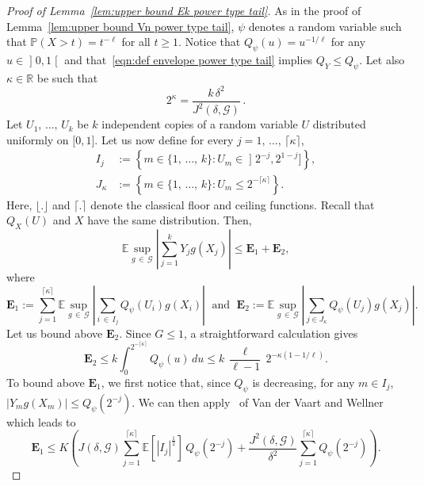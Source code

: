\documentclass[10pt]{amsart}
\theoremstyle{definition}\newtheorem{defi}[theo]{Definition}\newtheorem{rema}[theo]{Remark}\newtheorem{exam}[theo]{Example}\newtheorem{exem}[theo]{Example}\newtheorem{nota}[theo]{Notation}
\newcommand{\bE}{\mathbb{E}}
\newcommand{\bP}{\mathbb{P}}
\newcommand{\bR}{\mathbb{R}}
\newcommand{\bfE}{\mathbf{E}}
\newcommand{\caG}{\mathscr{G}}
\newcommand{\intervalleoo}[2]{\mathopen{]} #1\mathclose{}\mathpunct{},#2\mathclose{[}}
\newcommand{\intervalleff}[2]{\mathopen{[} #1\mathclose{}\mathpunct{},#2\mathclose{]}}
\newcommand{\intervalleof}[2]{\mathopen{]} #1\mathclose{}\mathpunct{},#2\mathclose{]}}
\begin{document}
\begin{proof}[Proof of Lemma~\ref{lem:upper bound Ek power type tail}]
As in the proof of Lemma~\ref{lem:upper bound Vn power type tail}, $\psi$ denotes a random variable such that $\bP(X>t)=t^{-\ell}$ for all $t\geq1$. Notice that $Q_\psi(u)=u^{-1/\ell}$ for any $u\in \intervalleoo 01$ and that~\eqref{eqn:def envelope power type tail} implies $Q_Y\leq Q_\psi$. Let also $\kappa\in\bR$ be such that
\begin{equation}\label{eqn:def kappa}
2^\kappa = \frac{k\,\delta^2}{J^2(\delta,\caG)}\,.
\end{equation}
Let $U_1,\,\ldots,\,U_k$ be $k$ independent copies of a random variable $U$ distributed uniformly on $\intervalleff 01$. Let us now define for every $j=1,\,\ldots,\,\lceil\kappa\rceil$,
\begin{align*}
I_j &:= \left\{ m\in\{1,\,\ldots,\,k\} : U_m\in\intervalleof {2^{-j}}{ 2^{1-j}} \right\}, \\
J_\kappa &:= \left\{ m\in\{1,\,\ldots,\,k\} : U_m\leq 2^{-\lceil\kappa\rceil}\right\}.
\end{align*}
Here, $\lfloor. \rfloor$ and $\lceil.\rceil$ denote the classical floor and ceiling functions. Recall that $Q_X(U)$ and $X$ have the same distribution. Then,
\begin{equation}\label{eqn:bound mean decomposition}
\bE\sup_{g\,\in\,\caG}\left|\sum_{j=1}^k Y_jg(X_j)\right|\leq \bfE_1 + \bfE_2,
\end{equation}
where
\[
\bfE_1:= \sum_{j=1}^{\lceil\kappa\rceil} \bE\sup_{g\,\in\,\caG}\left|\sum_{i\,\in\,I_j}Q_\psi(U_i)g(X_i)\right|\;\text{ and }\; \bfE_2:=\bE\sup_{g\,\in\,\caG}\left|\sum_{j\in J_\kappa}Q_\psi(U_j)g(X_j)\right|.
\]
Let us bound above $\bfE_2$. Since $G\leq 1$, a straightforward calculation gives
\begin{equation}\label{eqn:Final E_2}
\bfE_2 \leq k\int_0^{2^{-\lceil\kappa\rceil}} Q_\psi(u)\,du \leq k\, \frac{\ell}{\ell-1}\,2^{-\kappa(1-1/\ell)}.
\end{equation}
To bound above $\bfE_1$, we first notice that, since $Q_\psi$ is decreasing, for any $m\in I_j$, $|Y_mg(X_m)|\leq Q_\psi(2^{-j})$. We can then apply~\cite[Theorem~2.1]{vdVW11} of Van der Vaart and Wellner which leads to
\begin{equation}\label{eqn:E_1 eq1}
\bfE_1\leq K\left(J(\delta,\caG)\sum_{j=1}^{\lceil\kappa\rceil} \bE\left[|I_j|^{\frac{1}{2}}\right]\,Q_\psi(2^{-j}) + \frac{J^2(\delta,\caG)}{\delta^2}\sum_{j=1}^{\lceil\kappa\rceil} Q_\psi(2^{-j})\right).
\end{equation}

\end{proof}
\end{document}
